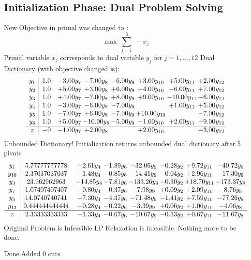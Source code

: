 \documentclass[8pt]{article}
\begin{document}
\subsection{Initialization Phase: Dual Problem Solving}
New Objective in primal was changed to : \[ \max\ \sum_{j=1}^{6}\ - x_j \] 
Primal variable $x_j$ corresponds to dual variable $y_j$ for $j = 1,\ldots,12$
Dual Dictionary (with objective changed is): 
\[\begin{array}{c| c c@{\hskip 2pt} c@{\hskip 2pt} c@{\hskip 2pt} c@{\hskip 2pt} c@{\hskip 2pt} c@{\hskip 2pt} }
 y_{1}   &  1.0 & -3.00 y_{7} & -7.00 y_{8} & -6.00 y_{9} & +  3.00 y_{10} & +  5.00 y_{11} & +  2.00 y_{12}\\
 y_{2}   &  1.0 & +  5.00 y_{7} & +  3.00 y_{8} & +  6.00 y_{9} & -4.00 y_{10} & -6.00 y_{11} & +  7.00 y_{12}\\
 y_{3}   &  1.0 & +  4.00 y_{7} & -7.00 y_{8} & +  8.00 y_{9} & +  9.00 y_{10} & -10.00 y_{11} & -6.00 y_{12}\\
 y_{4}   &  1.0 & -3.00 y_{7} & -6.00 y_{8} & -7.00 y_{9} &   & +  1.00 y_{11} & +  5.00 y_{12}\\
 y_{5}   &  1.0 & -7.00 y_{7} & +  6.00 y_{8} & -7.00 y_{9} & + 10.00 y_{10} &   & -7.00 y_{12}\\
 y_{6}   &  1.0 & +  5.00 y_{7} & -10.00 y_{8} & -5.00 y_{9} & -1.00 y_{10} & +  2.00 y_{11} & -9.00 y_{12}\\
\hline
z    &  -0 & -1.00 y_{7} & +  2.00 y_{8} &   & +  2.00 y_{10} &   & -3.00 y_{12}\\
\end{array}\]
Unbounded Dictionary!
Initialization returns unbounded dual dictionary after 5 pivots
\[\begin{array}{c| c c@{\hskip 2pt} c@{\hskip 2pt} c@{\hskip 2pt} c@{\hskip 2pt} c@{\hskip 2pt} c@{\hskip 2pt} }
 y_{1}   &  5.77777777778 & -2.61 y_{4} & -1.89 y_{6} & -32.06 y_{9} & -0.28 y_{2} & +  9.72 y_{11} & -40.72 y_{8}\\
 y_{10}   &  2.37037037037 & -1.48 y_{4} & -0.85 y_{6} & -14.41 y_{9} & -0.04 y_{2} & +  2.96 y_{11} & -17.30 y_{8}\\
 y_{3}   &  23.962962963 & -14.85 y_{4} & -7.81 y_{6} & -133.26 y_{9} & -0.30 y_{2} & + 18.70 y_{11} & -173.37 y_{8}\\
 y_{7}   &  1.07407407407 & -0.80 y_{4} & -0.37 y_{6} & -7.98 y_{9} & +  0.09 y_{2} & +  2.09 y_{11} & -8.76 y_{8}\\
 y_{5}   &  14.0740740741 & -7.30 y_{4} & -4.37 y_{6} & -71.48 y_{9} & -1.41 y_{2} & +  7.59 y_{11} & -77.26 y_{8}\\
 y_{12}   &  0.444444444444 & -0.28 y_{4} & -0.22 y_{6} & -3.39 y_{9} & +  0.06 y_{2} & +  1.06 y_{11} & -4.06 y_{8}\\
\hline
z    &  2.33333333333 & -1.33 y_{4} & -0.67 y_{6} & -10.67 y_{9} & -0.33 y_{2} & +  0.67 y_{11} & -11.67 y_{8}\\
\end{array}\]
Original Problem is Infeasible
 LP Relaxation is infeasible. Nothing more to be done. 

Done.Added 0 cuts 
\end{document}
